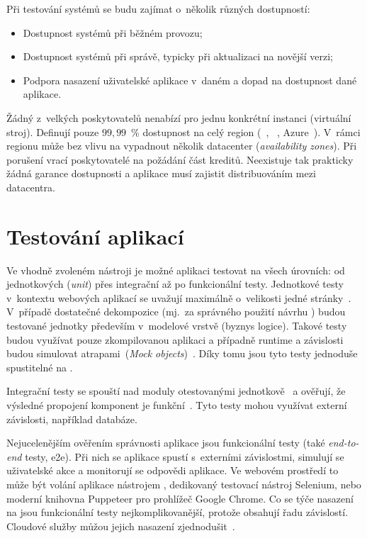         Při testování \CICD systémů se budu zajímat o~několik různých dostupností:
        \begin{itemize}
            \item Dostupnost \CICD systémů při běžném provozu;
            \item Dostupnost \CICD systémů při správě, typicky při aktualizaci na novější verzi;
            \item Podpora nasazení uživatelské aplikace v~daném \CICD a dopad na dostupnost dané aplikace.
        \end{itemize}

        Žádný z~velkých poskytovatelů nenabízí  pro jednu konkrétní instanci (virtuální stroj). Definují pouze $99,99$~\% dostupnost na celý region (~\cite{aws-sla}, ~\cite{gcp-sla}, Azure~\cite{azure-sla}). V~rámci regionu může bez vlivu na  vypadnout několik datacenter (\textit{availability zones}). Při porušení  vrací poskytovatelé na požádání část kreditů. Neexistuje tak prakticky žádná garance dostupnosti a aplikace musí  zajistit distribuováním mezi datacentra.

    \section*{Testování aplikací}
        Ve vhodně zvoleném \CI nástroji je možné aplikaci testovat na všech úrovních: od jednotkových (\textit{unit}) přes integrační až po funkcionální testy. Jednotkové testy v~kontextu webových aplikací se uvažují maximálně o~velikosti jedné stránky~\cite{testing-web-apps}. V~případě dostatečné dekompozice (mj.~za správného použití návrhu ) budou testované jednotky především v~modelové vrstvě (byznys logice). Takové testy budou využívat pouze zkompilovanou aplikaci a případně runtime a závislosti budou simulovat atrapami~(\textit{Mock objects})~\cite{mocks}. Díky tomu jsou tyto testy jednoduše spustitelné na \CI.

        Integrační testy se spouští nad moduly otestovanými jednotkově~\cite{ould1986testing} a ověřují, že výsledné propojení komponent je funkční~\cite{integration-tests}. Tyto testy mohou využívat externí závislosti, například databáze.

        Nejucelenějším ověřením správnosti aplikace jsou funkcionální testy (také \textit{end-to-end} testy, e2e). Při nich se aplikace spustí s~externími závislostmi, simulují se uživatelské akce a monitorují se odpovědi aplikace. Ve webovém prostředí to může být volání aplikace nástrojem , dedikovaný testovací nástroj Selenium, nebo moderní knihovna Puppeteer pro prohlížeč Google Chrome. Co se týče nasazení na \CI jsou funkcionální testy nejkomplikovanější, protože obsahují řadu závislostí. Cloudové služby můžou jejich nasazení zjednodušit~\cite{gcp-headless}.

